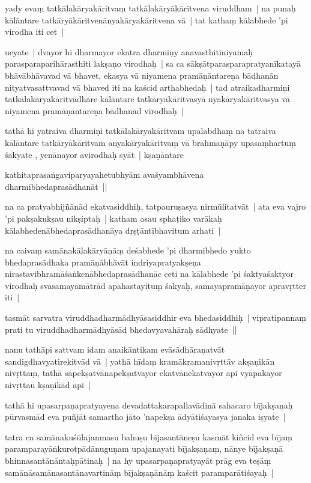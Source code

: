 \documentclass[article,12pt,a4paper]{memoir}
\begin{document}
	  \pstart yady evaṃ tatkālakāryakāritvaṃ tatkālakāryākāritvena viruddham | na punaḥ kālāntare tatkāryākāritvenānyakāryakāritvena vā | tat kathaṃ kālabhede 'pi virodha iti cet |
	\pend
      

	  \pstart ucyate | dvayor hi dharmayor ekatra dharmiṇy anavasthitiniyamaḥ parasparaparihārasthiti lakṣaṇo virodhaḥ | sa ca sākṣātparasparapratyanīkatayā bhāvābhāvavad vā bhavet, ekasya vā niyamena pramāṇāntareṇa bādhanān nityatvasattvavad vā bhaved iti na kaścid arthabhedaḥ | tad atraikadharmiṇi tatkālakāryakāritvādhāre kālāntare tatkāryākāritvasyā nyakāryakāritvasya vā niyamena pramāṇāntareṇa bādhanād virodhaḥ | 
	\pend
      

	  \pstart tathā hi yatraiva dharmiṇi tatkālakāryakāritvam upalabdhaṃ na tatraiva kālāntare tatkāryākāritvam anyakāryakāritvaṃ vā brahmaṇāpy upasaṃhartuṃ śakyate , yenānayor avirodhaḥ syāt | kṣaṇāntare
	\pend
      

	  \pstart kathitaprasaṅgaviparyayahetubhyām avaśyambhāvena dharmibhedaprasādhanāt ||
	\pend
      

	  \pstart na ca pratyabhijñānād ekatvasiddhiḥ, tatpauruṣasya nirmūlitatvāt | ata eva vajro 'pi pakṣakukṣau nikṣiptaḥ | katham asau sphaṭiko varākaḥ kālabhedenābhedaprasādhanāya dṛṣṭāntībhavitum arhati | 
	\pend
      

	  \pstart na caivaṃ samānakālakāryāṇāṃ deśabhede 'pi dharmibhedo yukto bhedaprasādhaka pramāṇābhāvāt indriyapratyakṣeṇa nirastavibhramāśaṅkenābhedaprasādhanāc ceti na kālabhede 'pi śaktyaśaktyor virodhaḥ svasamayamātrād apahastayituṃ śakyaḥ, samayapramāṇayor apravṛtter iti |
	\pend
      

	  \pstart tasmāt sarvatra viruddhadharmādhyāsasiddhir eva bhedasiddhiḥ | vipratipannaṃ prati tu viruddhadharmādhyāsād bhedavyavahāraḥ sādhyate ||
	\pend
      

	  \pstart nanu tathāpi sattvam idam anaikāntikam evāsādhāraṇatvāt sandigdhavyatirekitvād vā | yathā hīdaṃ kramākramanivṛttāv akṣaṇikān nivṛttaṃ, tathā sāpekṣatvānapekṣatvayor ekatvānekatvayor api vyāpakayor nivṛttau kṣaṇikād api | 
	\pend
      

	  \pstart tathā hi upasarpaṇapratyayena devadattakarapallavādinā sahacaro bījakṣaṇaḥ pūrvasmād eva puñjāt samartho jāto 'napekṣa ādyātiśayasya janaka iṣyate | 
	\pend
      

	  \pstart tatra ca samānakuśūlajanmasu bahuṣu bījasantāneṣu kasmāt kiñcid eva bījaṃ paramparayāṅkurotpādānuguṇam upajanayati bījakṣaṇaṃ, nānye bījakṣaṇā bhinnasantānāntaḥpātinaḥ | na hy upasarpaṇapratyayāt prāg eva teṣāṃ samānāsamānasantānavartināṃ bījakṣaṇānāṃ kaścit paramparātiśayaḥ | 
	\pend
      
\end{document}
